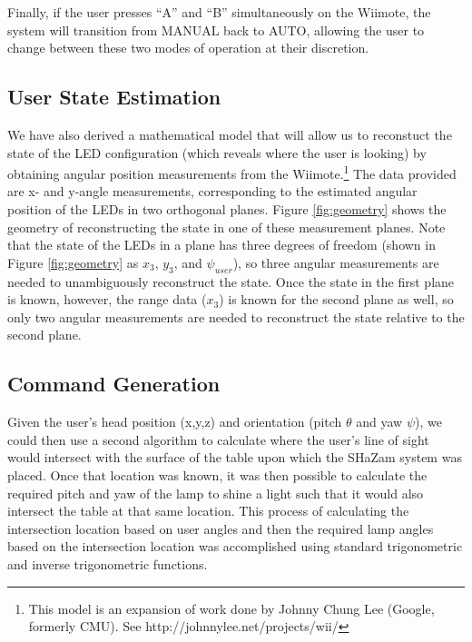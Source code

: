 \documentclass[conference, twocolumn]{IEEEtran}
\begin{document}
Finally, if the user presses ``A'' and ``B'' simultaneously on the Wiimote, the system will transition from MANUAL back to AUTO, allowing the user to change between these two modes of operation at their discretion.

\subsection*{User State Estimation}
We have also derived a mathematical model that will allow us to reconstuct the state of the LED configuration (which reveals where the user is looking) by obtaining angular position measurements from the Wiimote.\footnote{This model is an expansion of work done by Johnny Chung Lee (Google, formerly CMU). See http://johnnylee.net/projects/wii/} The data provided are x- and y-angle measurements, corresponding to the estimated angular position of the LEDs in two orthogonal planes. Figure \ref{fig:geometry} shows the geometry of reconstructing the state in one of these measurement planes. Note that the state of the LEDs in a plane has three degrees of freedom (shown in Figure \ref{fig:geometry} as $x_{3}$, $y_{3}$, and $\psi_{user}$), so three angular measurements are needed to unambiguously reconstruct the state. Once the state in the first plane is known, however, the range data ($x_3$) is known for the second plane as well, so only two angular measurements are needed to reconstruct the state relative to the second plane. 

\subsection*{Command Generation}
Given the user's head position (x,y,z) and orientation (pitch $\theta$ and yaw $\psi$), we could then use a second algorithm to calculate where the user's line of sight would intersect with the surface of the table upon which the SHaZam system was placed. Once that location was known, it was then possible to calculate the required pitch and yaw of the lamp to shine a light such that it would also intersect the table at that same location. This process of calculating the intersection location based on user angles and then the required lamp angles based on the intersection location was accomplished using standard trigonometric and inverse trigonometric functions.
\end{document}
